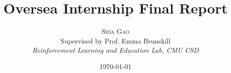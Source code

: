 \title{\textbf{Oversea Internship Final Report} %
} %

\author{\textsc{Sida Gao} %
\\{Supervised by Prof. Emma Brunskill}
\\{\textit{Reinforcement Learning and Education Lab, CMU CSD}}} %

\date{\today} %